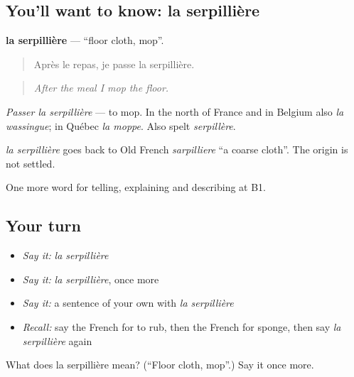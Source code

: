 \subsection*{You'll want to know: la serpillière}
\textbf{la serpillière} — \textquotedblleft{}floor cloth, mop\textquotedblright{}.

\begin{quote}
Après le repas, je passe la serpillière.
\end{quote}

\begin{quote}
\emph{After the meal I mop the floor.}
\end{quote}

\emph{Passer la serpillière} — to mop. In the north of France and in Belgium also \emph{la wassingue}; in Québec \emph{la moppe}. Also spelt \emph{serpillère}.

\begin{cousinweb}
\emph{la serpillière} goes back to Old French \emph{sarpilliere} \textquotedblleft{}a coarse cloth\textquotedblright{}. The origin is not settled.
\end{cousinweb}

\begin{grammarlens}[title={What you've built}]
One more word for telling, explaining and describing at B1.
\end{grammarlens}

\subsection*{Your turn}
\begin{itemize}
\raggedright
  \item \emph{Say it:} \emph{la serpillière}
  \item \emph{Say it:} \emph{la serpillière}, once more
  \item \emph{Say it:} a sentence of your own with \emph{la serpillière}
  \item \emph{Recall:} say the French for to rub, then the French for sponge, then say \emph{la serpillière} again
\end{itemize}

\begin{tcolorbox}[breakable,colback=teal!4,colframe=teal!35!black,title={Before you move on}]
What does la serpillière mean? (\textquotedblleft{}Floor cloth, mop\textquotedblright{}.) Say it once more.
\end{tcolorbox}

